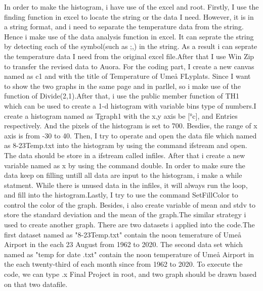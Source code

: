 \documentclass[a4, 12pt]{article}
\begin{document}
\newline \indent
In order to make the histogram, i have use of the excel and root. Firstly, I use the finding function in excel to locate the string or the data I need. However, it is in a string format, and i need to separate the temperature data from the string. Hence i make use of the data analysis function in excel. It can seprate the string by detecting each of the symbol(such as ;,) in the string. As a result i can seprate the temperature data I need from the original excel file.After that I use Win Zip to transfer the revised data to Auora. For the coding part, I create a new canvas named as c1 and with the title of Temperature of Umeå FLyplats. Since I want to show the two graphs in the same page and in parllel, so i make use of the function of Divide(2,1).After that, i use the public member function of TH1 which can be used to create a 1-d histogram with variable bins type of numbers.I create a histogram named as Tgraph1 with the x,y axis be [°c], and Entries respectively. And the pixels of the histogram is set to 700. Besdies, the range of x axis is from -30 to 40. Then, I try to operate and open  the data file which named as 8-23Temp.txt into the histogram by using the command ifstream and open. The data should be store in a ifstream called infiles. After that i create a new variable named as x by using the command double. In order to make sure the data keep on filling untill all data are input to the histogram, i make a while statment. While there is unused data in the infiles, it will always run the loop, and fill into the histogram.Lastly, I try to use  the command SetFillColor to control the color of the graph. Besides, i also create variable of mean and stdv to store the standard deviation and the mean of the graph.The similar strategy i used to create another graph. There are two datasets i applied into the code.The first dataset named as "8-23Temp.txt" contain the noon temerature of Umeå Airport in the each 23 August from 1962 to 2020. The second data set which named as "temp for date .txt" contain the noon temperature of Umeå Airport in the each twenty-third of each month since from 1962 to 2020. To execute the code, we can type .x Final Project in root, and two graph should be drawn based on that two datafile.
\end{document}
